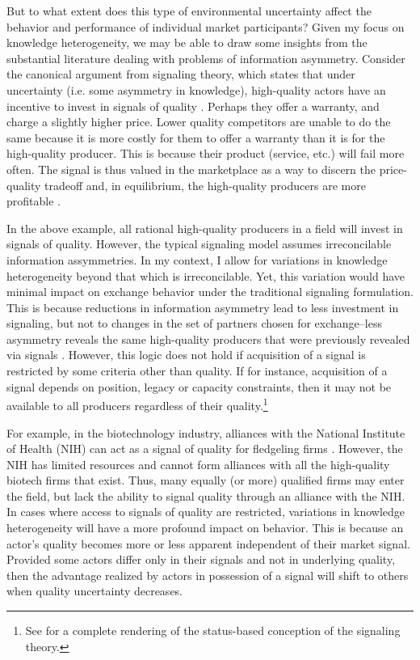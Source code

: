 But to what extent does this type of environmental uncertainty affect the behavior and performance of individual market participants? Given my focus on knowledge heterogeneity, we may be able to draw some insights from the substantial literature dealing with problems of information asymmetry. Consider the canonical argument from signaling theory, which states that under uncertainty (i.e. some asymmetry in knowledge), high-quality actors have an incentive to invest in signals of quality \citep{kirmani2000}. Perhaps they offer a warranty, and charge a slightly higher price. Lower quality competitors are unable to do the same because it is more costly for them to offer a warranty than it is for the high-quality producer. This is because their product (service, etc.) will fail more often. The signal is thus valued in the marketplace as a way to discern the price-quality tradeoff and, in equilibrium, the high-quality producers are more profitable \citep{kirmani2000, spence1973}.

In the above example, all rational high-quality producers in a field will invest in signals of quality. However, the typical signaling model assumes irreconcilable information assymmetries. In my context, I allow for variations in knowledge heterogeneity beyond that which is irreconcilable. Yet, this variation would have minimal impact on exchange behavior under the traditional signaling formulation. This is because reductions in information asymmetry lead to less investment in signaling, but not to changes in the set of partners chosen for exchange--less asymmetry reveals the same high-quality producers that were previously revealed via signals \citep{podolny2005}. However, this logic does not hold if acquisition of a signal is restricted by some criteria other than quality. If for instance, acquisition of a signal depends on position, legacy or capacity constraints, then it may not be available to all producers regardless of their quality.\footnote{See \citet{podolny2005} for a complete rendering of the status-based conception of the \citet{spence1973} signaling theory.}

For example, in the biotechnology industry, alliances with the National Institute of Health (NIH) can act as a signal of quality for fledgeling firms \citep{baum2000, podolny2001, shane2002}. However, the NIH has limited resources and cannot form alliances with all the high-quality biotech firms that exist. Thus, many equally (or more) qualified firms may enter the field, but lack the ability to signal quality through an alliance with the NIH. In cases where access to signals of quality are restricted, variations in knowledge heterogeneity will have a more profound impact on behavior. This is because an actor's quality becomes more or less apparent independent of their market signal. Provided some actors differ only in their signals and not in underlying quality, then the advantage realized by actors in possession of a signal will shift to others when quality uncertainty decreases.

